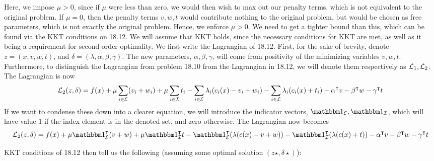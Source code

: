 \begin{solution}
    Here, we impose $\mu > 0$, since if $\mu$ were less than zero, we would then wish to max out our penalty terms, which is not equivalent to the original problem. If $\mu = 0$, then the penalty terms $v, w, t$ would contribute nothing to the original problem, but would be chosen as free parameters, which is not exactly the original problem. Hence, we enforce $\mu > 0$. We need to get a tighter bound than this, which can be found via the KKT conditions on 18.12. We will assume that KKT holds, since the necessary conditions for KKT are met, as well as it being a requirement for second order optimality. We first write the Lagrangian of 18.12. First, for the sake of brevity, denote $z = (x, v, w, t)$, and $\delta = (\lambda, \alpha, \beta, \gamma)$. The new parameters, $\alpha, \beta, \gamma$, will come from positivity of the minimizing variables $v, w, t$. Furthermore, to distinguish the Lagrangian from problem 18.10 from the Lagrangian in 18.12, we will denote them respectively as $\mathcal{L}_1, \mathcal{L}_2$. The Lagrangian is now
    \[\mathcal{L}_2(z, \delta) = f(x) + \mu\sum_{i \in \mathcal{E}} (v_i + w_i) + \mu \sum_{i \in \mathcal{I}} t_i - \sum_{i \in \mathcal{E}} \mathrm{\lambda}_i (c_i(x) - v_i + w_i) - \sum_{i \in \mathcal{L}} \mathrm{\lambda}_i (c_i(x) + t_i) - \alpha^{\intercal} v - \beta^{\intercal} w - \gamma^{\intercal} t\]
    If we want to condense these down into a clearer equation, we will introduce the indicator vectors, $\ind_\scE, \ind_\scI$, which will have value 1 if the index element is in the denoted set, and zero otherwise. The Lagrangian now becomes
    \[\scL_2(z, \delta) = f(x) + \mu\ind_\scE\T (v + w) + \mu\ind_\scI\T t - \ind_\scE\T(\lm (c(x) - v + w)) - \ind_\scI\T (\lm (c(x) + t)) - \alpha\T v - \beta\T w - \gamma\T t\]

    \newpage
    KKT conditions of 18.12 then tell us the following (assuming some optimal solution $(z\star, \delta\star)$):


\end{solution}
